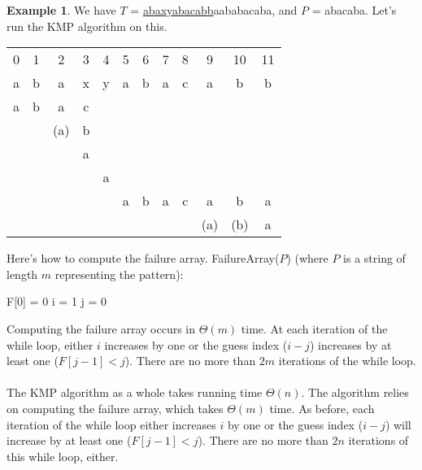 \documentclass[]{article}
\theoremstyle{definition}
\newtheorem{ex}{Example}[section]
\newcommand{\lecture}[1]{\marginpar{{\footnotesize $\leftarrow$ \underline{#1}}}}
\begin{document}
				\begin{ex} \lecture{March 21, 2013}
					We have $T$ = \underline{abaxyabacabb}aababacaba, and $P$ = abacaba. Let's run the KMP algorithm on this.

					\begin{center}
						\begin{tabular}{|c|c|c|c|c|c|c|c|c|c|c|c|}
							0 & 1 & 2 & 3 & 4 & 5 & 6 & 7 & 8 & 9 & 10 & 11 \\
							a & b & a & x & y & a & b & a & c & a & b & b \\ \hline \hline
							a & b & a & c & & & & & & & & \\
							& & (a) & b & & & & & & & & \\
							& & & a & & & & & & & & \\
							& & & & a & & & & & & & \\
							& & & & & a & b & a & c & a & b & a \\
							& & & & & & & & & (a) & (b) & a \\ \hline
						\end{tabular}
					\end{center}
				\end{ex}

				Here's how to compute the failure array. FailureArray($P$) (where $P$ is a string of length $m$ representing the pattern): \\
				\begin{algorithm}[H]
					F[0] = 0\;
					i = 1\;
					j = 0\;
				\end{algorithm}

				Computing the failure array occurs in $\Theta(m)$ time. At each iteration of the while loop, either $i$ increases by one or the guess index ($i - j$) increases by at least one ($F[j - 1] < j$). There are no more than $2m$ iterations of the while loop.
				\\ \\
				The KMP algorithm as a whole takes running time $\Theta(n)$. The algorithm relies on computing the failure array, which takes $\Theta(m)$ time. As before, each iteration of the while loop either increases $i$ by one or the guess index ($i - j$) will increase by at least one ($F[j - 1] < j$). There are no more than $2n$ iterations of this while loop, either.
\end{document}
